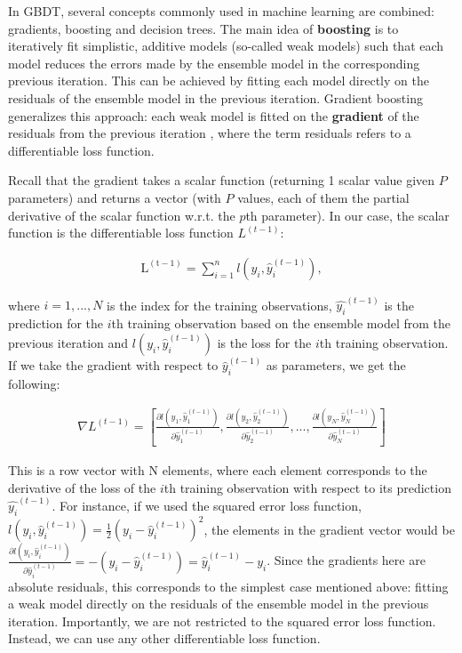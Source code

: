 \documentclass{article}
\begin{document}
	In GBDT, several concepts commonly used in machine learning are combined: gradients, boosting and decision trees. The main idea of \textbf{boosting} is to iteratively fit simplistic, additive models (so-called weak models) such that each model reduces the errors made by the ensemble model in the corresponding previous iteration. This can be achieved by fitting each model directly on the residuals of the ensemble model in the previous iteration. Gradient boosting generalizes this approach: each weak model is fitted on the \textbf{gradient} of the residuals from the previous iteration  \cite{chen_xgboost:_2016} \cite{friedman_greedy_2001}  \cite{noauthor_kaggle_nodate}, where the term residuals refers to a differentiable loss function.
	
	Recall that the gradient takes a scalar function (returning 1 scalar value given $P$ parameters) and returns a vector  (with $P$ values, each of them the partial derivative of the scalar function w.r.t. the $p$th parameter). In our case, the scalar function is the differentiable loss function $L^{(t-1)}$:

	\begin{align}
	\mathrm{L^{(t-1)}} = \sum_{i=1}^n l(y_i, \hat{y}_i^{(t-1)}), 
	\end{align} 
	
	where $i = 1, ..., N$ is the index for the training observations, $\hat{y_i}^{(t-1)}$ is the prediction for the $i$th training observation based on the ensemble model from the previous iteration and $l(y_i, \hat{y}_i^{(t-1)})$ is the loss for the $i$th training observation. If we take the gradient with respect to $\hat{y}_i^{(t-1)}$ as parameters, we get the following:
	
	\begin{align}
		\nabla L^{(t-1)} = \left[\frac{\partial l(y_1, \hat{y}_1^{(t-1)})}{\partial \hat{y}_1^{(t-1)}}, \frac{\partial l(y_2, \hat{y}_2^{(t-1)})}{\partial \hat{y}_2^{(t-1)}}, ..., \frac{\partial l(y_N, \hat{y}_N^{(t-1)})}{\partial \hat{y}_N^{(t-1)}}\right]
	\end{align}
	
	This is a row vector with N elements, where each element corresponds to the derivative of the loss of the $i$th training observation with respect to its prediction $\hat{y_i}^{(t-1)}$. For instance, if we used the squared error loss function, $l(y_i, \hat{y}_i^{(t-1)}) = \frac{1}{2} \left(y_i - \hat{y}_i^{(t-1)}\right)^2$, the elements in the gradient vector would be $\frac{\partial l(y_i, \hat{y}_i^{(t-1)})}{\partial \hat{y}_i^{(t-1)}} = -\left(y_i - \hat{y}_i^{(t-1)}\right) = \hat{y}_i^{(t-1)} - y_i$. Since the gradients here are absolute residuals, this corresponds to the simplest case mentioned above: fitting a weak model directly on the residuals of the ensemble model in the previous iteration. Importantly, we are not restricted to the squared error loss function. Instead, we can use any other differentiable loss function.
	
\end{document}
